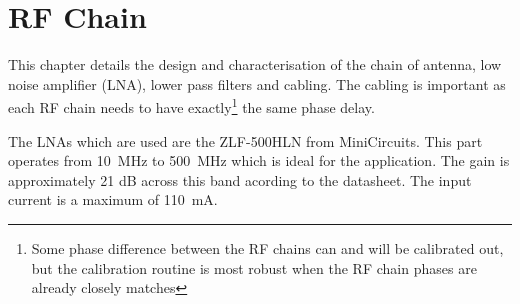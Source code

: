 \chapter{RF Chain}

This chapter details the design and characterisation of the chain of antenna, low noise amplifier (LNA), lower pass filters and cabling. The cabling is important as each RF chain needs to have exactly\footnote{Some phase difference between the RF chains can and will be calibrated out, but the calibration routine is most robust when the RF chain phases are already closely matches} the same phase delay.

The LNAs which are used are the ZLF-500HLN from MiniCircuits. This part operates from \SI{10}{\mega\hertz} to \SI{500}{\mega\hertz} which is ideal for the application. The gain is approximately 21 dB across this band acording to the datasheet. The input current is a maximum of \SI{110}{\milli\ampere}.
